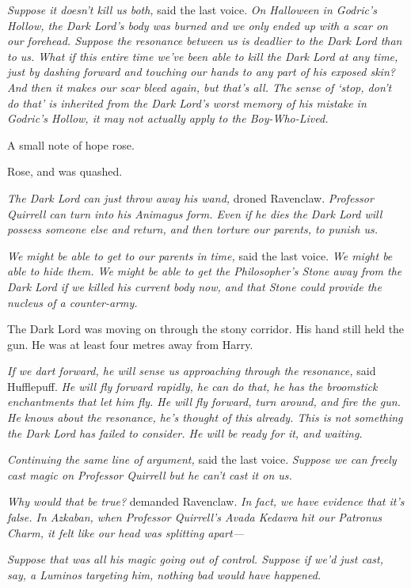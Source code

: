 \emph{Suppose it doesn’t kill us both,} said the last voice. \emph{On Halloween in Godric’s Hollow, the Dark Lord’s body was burned and we only ended up with a scar on our forehead. Suppose the resonance between us is deadlier to the Dark Lord than to us. What if this entire time we’ve been able to kill the Dark Lord at any time, just by dashing forward and touching our hands to any part of his exposed skin? And then it makes our scar bleed again, but that’s all. The sense of ‘stop, don’t do that’ is inherited from the Dark Lord’s worst memory of his mistake in Godric’s Hollow, it may not actually apply to the Boy-Who-Lived.}

A small note of hope rose.

Rose, and was quashed.

\emph{The Dark Lord can just throw away his wand,} droned Ravenclaw. \emph{Professor Quirrell can turn into his Animagus form. Even if he dies the Dark Lord will possess someone else and return, and then torture our parents, to punish us.}

\emph{We might be able to get to our parents in time,} said the last voice. \emph{We might be able to hide them. We might be able to get the Philosopher’s Stone away from the Dark Lord if we killed his current body now, and that Stone could provide the nucleus of a counter-army.}

The Dark Lord was moving on through the stony corridor. His hand still held the gun. He was at least four metres away from Harry.

\emph{If we dart forward, he will sense us approaching through the resonance,} said Hufflepuff. \emph{He will fly forward rapidly, he can do that, he has the broomstick enchantments that let him fly. He will fly forward, turn around, and fire the gun. He knows about the resonance, he’s thought of this already. This is not something the Dark Lord has failed to consider. He will be ready for it, and waiting.}

\emph{Continuing the same line of argument,} said the last voice. \emph{Suppose we can freely cast magic on Professor Quirrell but he can’t cast it on us.}

\emph{Why would that be true?} demanded Ravenclaw. \emph{In fact, we have evidence that it’s false. In Azkaban, when Professor Quirrell’s Avada Kedavra hit our Patronus Charm, it felt like our head was splitting apart—}

\emph{Suppose that was all \emph{his} magic going out of control. Suppose if we’d just cast, say, a Luminos targeting him, nothing bad would have happened.}

